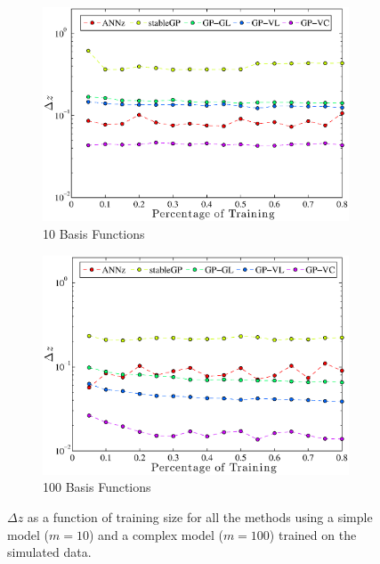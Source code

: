 \documentclass[useAMS,usenatbib,fleqn]{mn2e}
\begin{document}
\begin{figure}
        \centering
        \begin{subfigure}[b]{\columnwidth}
                \includegraphics[width=\textwidth]{figures/percentage10}
                \caption{10 Basis Functions}
                \label{fig-training-percentage-10}
        \end{subfigure}	
        \begin{subfigure}[b]{\columnwidth}
                \includegraphics[width=\textwidth]{figures/percentage100}
                \caption{100 Basis Functions}
                \label{fig-training-percentage-100}
        \end{subfigure}
       \caption{$\Delta z$ as a function of training size for all the methods using a simple model ($m=10$) and a complex model ($m=100$) trained on the simulated data.}
	\label{fig-normal-balanced}
\end{figure}
\end{document}
